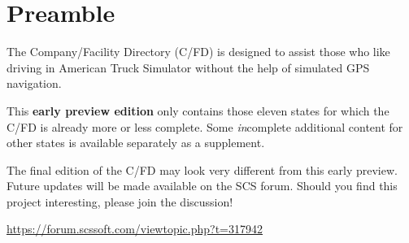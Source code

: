 \maketitle

\vspace{5mm}
\section*{Preamble}

{
\justifying

The Company/Facility Directory (C/FD) is designed to assist those who like driving in American Truck Simulator without the help of simulated GPS navigation.

This \textbf{early preview edition} only contains those eleven states for which the C/FD is already more or less complete.
Some \emph{in}complete additional content for other states is available separately as a supplement.

The final edition of the C/FD may look very different from this early preview.
Future updates will be made available on the SCS forum.
Should you find this project interesting, please join the discussion!

\centering \vspace{1ex}
\url{https://forum.scssoft.com/viewtopic.php?t=317942} \par
}

\copyrightblock
\thispagestyle{empty}

\tableofcontents
\thispagestyle{empty}
